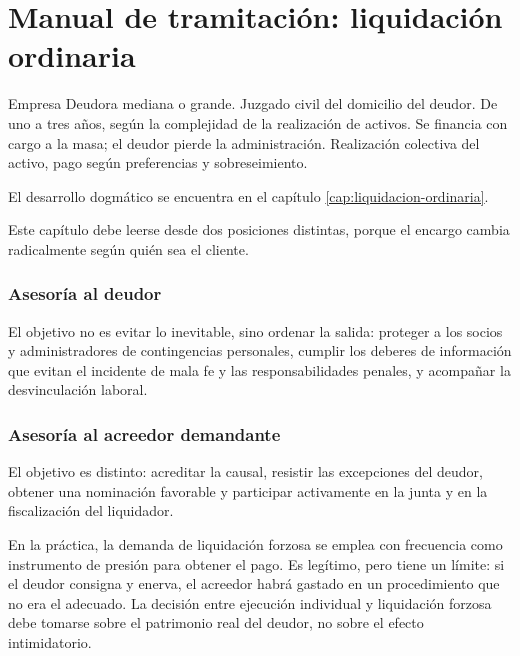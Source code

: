 \chapter{Manual de tramitación: liquidación ordinaria}
\label{cap:tram-liq-ordinaria}

\fichaProcedimiento
  {Empresa Deudora mediana o grande.}
  {Juzgado civil del domicilio del deudor.}
  {De uno a tres años, según la complejidad de la realización de activos.}
  {Se financia con cargo a la masa; el deudor pierde la administración.}
  {Realización colectiva del activo, pago según preferencias y sobreseimiento.}

El desarrollo dogmático se encuentra en el capítulo \ref{cap:liquidacion-ordinaria}.

\bloqueEncargo

Este capítulo debe leerse desde dos posiciones distintas, porque el encargo cambia
radicalmente según quién sea el cliente.

\subsection{Asesoría al deudor}

El objetivo no es evitar lo inevitable, sino ordenar la salida: proteger a los socios y
administradores de contingencias personales, cumplir los deberes de información que
evitan el incidente de mala fe y las responsabilidades penales, y acompañar la
desvinculación laboral.

\subsection{Asesoría al acreedor demandante}

El objetivo es distinto: acreditar la causal, resistir las excepciones del deudor,
obtener una nominación favorable y participar activamente en la junta y en la
fiscalización del liquidador.

\begin{foco}
En la práctica, la demanda de liquidación forzosa se emplea con frecuencia como
instrumento de presión para obtener el pago. Es legítimo, pero tiene un límite: si el
deudor consigna y enerva, el acreedor habrá gastado en un procedimiento que no era el
adecuado. La decisión entre ejecución individual y liquidación forzosa debe tomarse
sobre el patrimonio real del deudor, no sobre el efecto intimidatorio.
\end{foco}

